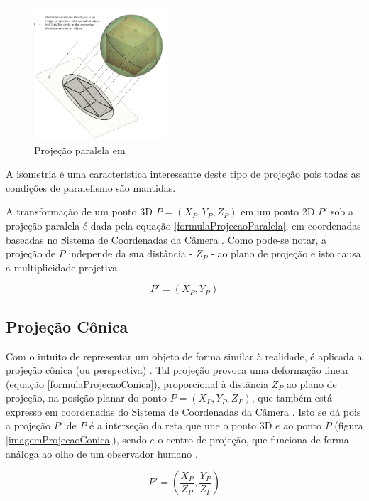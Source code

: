 		\begin{figure}[!htb]
			\centering
			\includegraphics[height=5cm]{imagens/projecaoParalela.jpg}
			\caption{Projeção paralela em \cite{archiGeoBook}}
			\label{imagemProjecaoParalela}
		\end{figure}
		
			A isometria é uma característica interessante deste tipo de projeção pois todas as condições de paralelismo são mantidas.
			
			A transformação de um ponto 3D $P = (X_P, Y_P, Z_P)$ em um ponto 2D $P'$ sob a projeção paralela é dada pela equação \ref{formulaProjecaoParalela}, em coordenadas baseadas no Sistema de Coordenadas da Câmera \cite{foto3D}. Como pode-se notar, a projeção de $P$ independe da sua distância - $Z_P$ - ao plano de projeção e isto causa a multiplicidade projetiva.
			
			\begin{equation}
				\label{formulaProjecaoParalela}
				P' = (X_P, Y_P)
			\end{equation}
			
		\subsection{Projeção Cônica}
			\label{subsecaoProjecaoConica}
			Com o intuito de representar um objeto de forma similar à realidade, é aplicada a projeção cônica (ou perspectiva) \cite{archiGeoBook}. Tal projeção provoca uma deformação linear (equação \ref{formulaProjecaoConica}), proporcional à distância $Z_P$ ao plano de projeção, na posição planar do ponto $P = (X_P, Y_P, Z_P)$, que também está expresso em coordenadas do Sistema de Coordenadas da Câmera \cite{foto3D}. Isto se dá pois a projeção $P'$ de $P$ é a interseção da reta que une o ponto 3D $e$ ao ponto $P$ (figura \ref{imagemProjecaoConica}), sendo $e$ o centro de projeção, que funciona de forma análoga ao olho de um observador humano \cite{archiGeoBook}.
			
			\begin{equation}
				\label{formulaProjecaoConica}
				P' = \left (\frac{X_P}{Z_P}, \frac{Y_P}{Z_P}\right )
			\end{equation}
			

